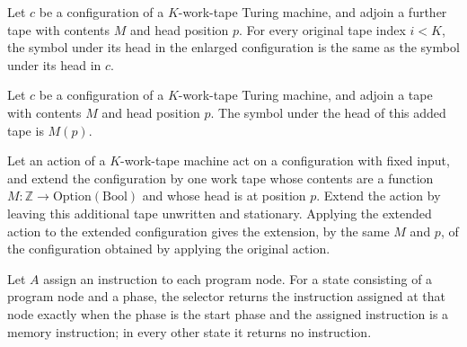 \begin{lemma}
\label{Complexity.LogProg.memCfg_symbols_castSucc}
\leanok
{}
Let $c$ be a configuration of a $K$-work-tape Turing machine, and adjoin a further tape
with contents $M$ and head position $p$. For every original tape index $i<K$, the symbol
under its head in the enlarged configuration is the same as the symbol under its head in
$c$.
\end{lemma}

\begin{lemma}
\label{Complexity.LogProg.memCfg_symbols_last}
\leanok
{}
Let $c$ be a configuration of a $K$-work-tape Turing machine, and adjoin a tape with
contents $M$ and head position $p$. The symbol under the head of this added tape is
$M(p)$.
\end{lemma}

\begin{lemma}
\label{Complexity.LogProg.liftAct_apply}
\leanok
{}
Let an action of a $K$-work-tape machine act on a configuration with fixed input, and
extend the configuration by one work tape whose contents are a function $M\colon\mathbb
Z\to\mathrm{Option}(\mathrm{Bool})$ and whose head is at position $p$. Extend the action
by leaving this additional tape unwritten and stationary. Applying the extended action
to the extended configuration gives the extension, by the same $M$ and $p$, of the
configuration obtained by applying the original action.
\end{lemma}

\begin{definition}
\label{Complexity.LogProg.mop}
\leanok
{}
Let $A$ assign an instruction to each program node. For a state consisting of a program
node and a phase, the selector returns the instruction assigned at that node exactly
when the phase is the start phase and the assigned instruction is a memory instruction;
in every other state it returns no instruction.
\end{definition}

